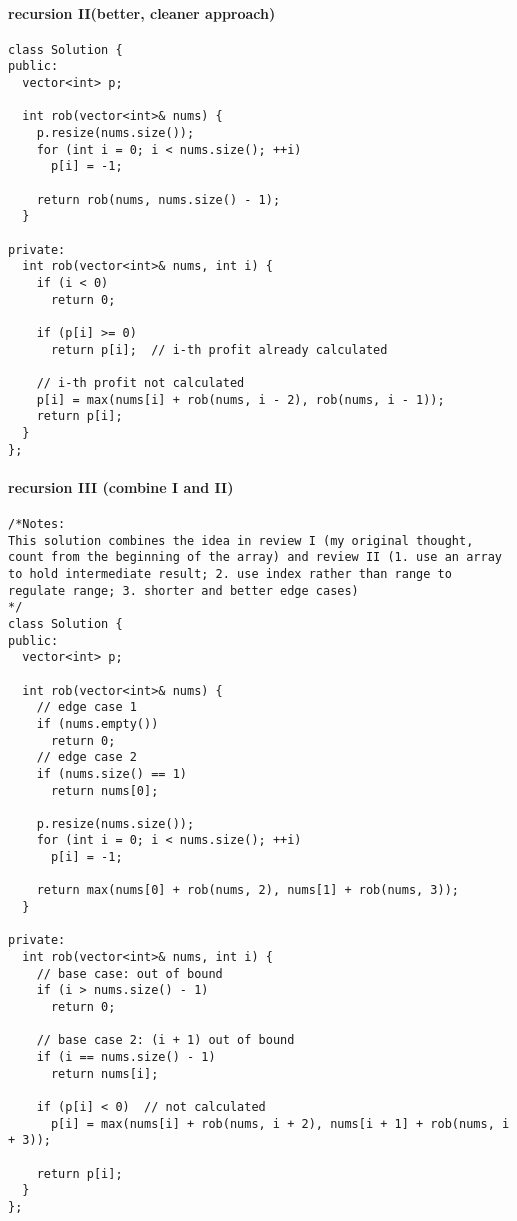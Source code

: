 \documentclass[11pt]{article}
\begin{document}
\paragraph{recursion II(better, cleaner approach)}
\label{sec:org1571bed}
\begin{verbatim}
class Solution {
public:
  vector<int> p;

  int rob(vector<int>& nums) {
    p.resize(nums.size());
    for (int i = 0; i < nums.size(); ++i)
      p[i] = -1;

    return rob(nums, nums.size() - 1);
  }

private:
  int rob(vector<int>& nums, int i) {
    if (i < 0)
      return 0;

    if (p[i] >= 0)
      return p[i];  // i-th profit already calculated

    // i-th profit not calculated  
    p[i] = max(nums[i] + rob(nums, i - 2), rob(nums, i - 1));
    return p[i];
  }
};
\end{verbatim}
\paragraph{recursion III (combine I and II)}
\label{sec:org376de47}
\begin{verbatim}
/*Notes: 
This solution combines the idea in review I (my original thought, count from the beginning of the array) and review II (1. use an array to hold intermediate result; 2. use index rather than range to regulate range; 3. shorter and better edge cases)
*/
class Solution {
public:
  vector<int> p;

  int rob(vector<int>& nums) {
    // edge case 1
    if (nums.empty())
      return 0;
    // edge case 2
    if (nums.size() == 1)
      return nums[0];

    p.resize(nums.size());
    for (int i = 0; i < nums.size(); ++i)
      p[i] = -1;

    return max(nums[0] + rob(nums, 2), nums[1] + rob(nums, 3));
  }

private:
  int rob(vector<int>& nums, int i) {
    // base case: out of bound
    if (i > nums.size() - 1)
      return 0;

    // base case 2: (i + 1) out of bound
    if (i == nums.size() - 1)
      return nums[i];

    if (p[i] < 0)  // not calculated
      p[i] = max(nums[i] + rob(nums, i + 2), nums[i + 1] + rob(nums, i + 3));

    return p[i];
  }
};
\end{verbatim}
\end{document}
